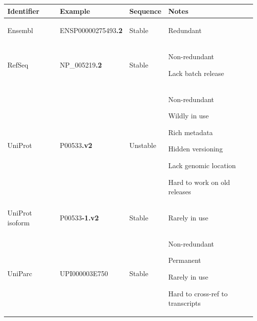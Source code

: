 \begin{SingleSpace}
\begin{table}[tbp]
    \vspace{0.5\baselineskip}
    \begin{subtable}{1\linewidth}
        \centering
        \label{tab:intro-anno-protein}
        \begin{tabular}{lllp{15em}}
            \toprule
            Identifier      & Example           & Sequence   & Notes \\
            \midrule
            Ensembl         & ENSP00000275493\textbf{.2}    & Stable &
            \begin{tablist}
                \item Redundant
            \end{tablist}\\
            RefSeq          & NP\_005219\textbf{.2}         & Stable &
            \begin{tablist}
                \item Non-redundant
                \item Lack batch release
            \end{tablist}\\
            UniProt         & P00533\textbf{.v2}            & Unstable &
            \begin{tablist}
                \item Non-redundant
                \item Wildly in use
                \item Rich metadata
                \item Hidden versioning
                \item Lack genomic location
                \item Hard to work on old releases
            \end{tablist}\\
            UniProt isoform & P00533\textbf{-1.v2}          & Stable &
            \begin{tablist}
                \item Rarely in use
            \end{tablist}\\
            UniParc         & UPI000003E750                 & Stable &
            \begin{tablist}
                \item Non-redundant
                \item Permanent
                \item Rarely in use
                \item Hard to cross-ref to transcripts
            \end{tablist}\\
            \bottomrule
        \end{tabular}
    \end{subtable}
\end{table}
\end{SingleSpace}


